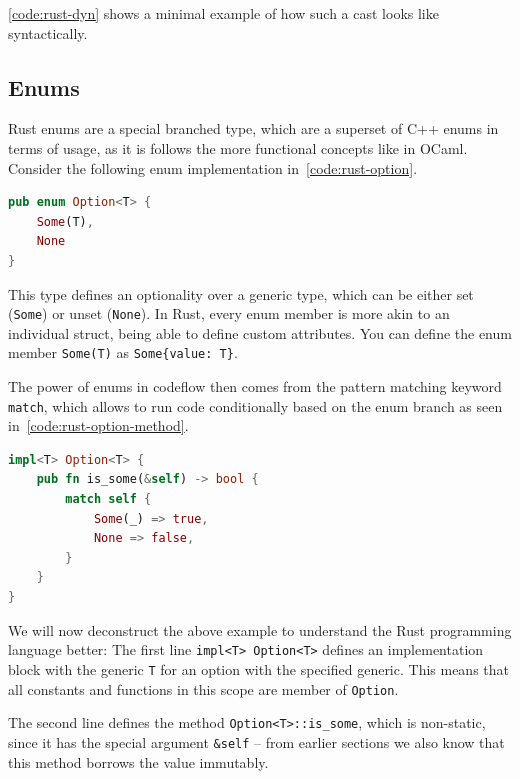 \documentclass[11pt,
               a4paper,
               bibtotoc,
               idxtotoc,
               headsepline,
               footsepline,
               footexclude,
               BCOR12mm,
               DIV13,
               openany,   %
               ]
               {scrbook}
\begin{document}
\autoref{code:rust-dyn} shows a minimal example of how such a cast looks like syntactically.

\subsection{Enums}

Rust enums are a special branched type, which are a superset of C++ enums in terms of usage, as it is follows the more functional concepts like in OCaml. Consider the following enum implementation in~\autoref{code:rust-option}.

\vspace{0.5em}
\begin{lstlisting}[style=eclipse-rust, language=Rust, basicstyle=\ttfamily\small, caption=Optionality in Rust, label=code:rust-option]
pub enum Option<T> {
    Some(T),
    None
}
\end{lstlisting}

This type defines an optionality over a generic type, which can be either set (\texttt{Some}) or unset (\texttt{None}). In Rust, every enum member is more akin to an individual struct, being able to define custom attributes. You can define the enum member \texttt{Some(T)} as \verb|Some{value: T}|.

The power of enums in codeflow then comes from the pattern matching keyword \texttt{match}, which allows to run code conditionally based on the enum branch as seen in~\autoref{code:rust-option-method}.

\vspace{0.5em}
\begin{lstlisting}[style=eclipse-rust, language=Rust, basicstyle=\ttfamily\small, caption={Optionality in Rust}, label=code:rust-option-method]
impl<T> Option<T> {
    pub fn is_some(&self) -> bool {
        match self {
            Some(_) => true,
            None => false,
        }
    }
}
\end{lstlisting}

We will now deconstruct the above example to understand the Rust programming language better: The first line \texttt{impl<T> Option<T>} defines an implementation block with the generic \texttt{T} for an option with the specified generic. This means that all constants and functions in this scope are member of \texttt{Option}.

The second line defines the method \texttt{Option<T>::is\_some}, which is non-static, since it has the special argument \texttt{\&self} -- from earlier sections we also know that this method borrows the value immutably.
\end{document}
